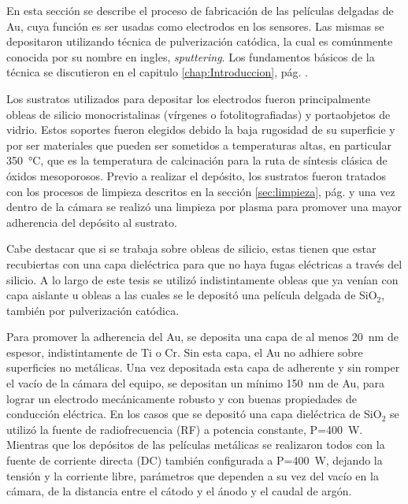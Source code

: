 			En esta sección se describe el proceso de fabricación de las películas delgadas de Au, cuya función es ser usadas como electrodos en los sensores. Las mismas se depositaron utilizando técnica de pulverización catódica, la cual es comúnmente conocida por su nombre en ingles, \textit{sputtering}\cite{sigmund1968}. Los fundamentos básicos de la técnica se discutieron en el capitulo \ref{chap:Introduccion}, pág. \pageref{sec:microfabricacion}.
							
			Los sustratos utilizados para depositar los electrodos fueron principalmente obleas de silicio monocristalinas (vírgenes o fotolitografiadas) y portaobjetos de vidrio. Estos soportes fueron elegidos debido la baja rugosidad de su superficie y por ser materiales que pueden ser sometidos a temperaturas altas, en particular \SI{350}{\celsius}, que es la temperatura de calcinación para la ruta de síntesis clásica de óxidos mesoporosos. Previo a realizar el depósito, los sustratos fueron tratados con los procesos de limpieza descritos en la sección \ref{sec:limpieza}, pág. \pageref{sec:limpieza} y una vez dentro de la cámara se realizó una limpieza por plasma para promover una mayor adherencia del depósito al sustrato.

			Cabe destacar que si se trabaja sobre obleas de silicio, estas tienen que estar recubiertas con una capa dieléctrica para que no haya fugas eléctricas a través del silicio. A lo largo de este tesis se utilizó indistintamente obleas que ya venían con capa aislante u obleas a las cuales se le depositó una película delgada de SiO$_2$, también por pulverización catódica.

			Para promover la adherencia del Au, se deposita una capa de al menos \SI{20}{\nm} de espesor, indistintamente de Ti o Cr. Sin esta capa, el Au no adhiere sobre superficies no metálicas\cite{Hieber1976}. Una vez depositada esta capa de adherente y sin romper el vacío de la cámara del equipo, se depositan un mínimo \SI{150}{\nm} de Au, para lograr un electrodo mecánicamente robusto y con buenas propiedades de conducción eléctrica. En los casos que se depositó una capa dieléctrica de SiO$_2$ se utilizó la fuente de radiofrecuencia (RF) a potencia constante, P=\SI{400}{W}. Mientras que los depósitos de las películas metálicas se realizaron todos con la fuente de corriente directa (DC) también configurada a P=\SI{400}{W}, dejando la tensión y la corriente libre, parámetros que dependen a su vez del vacío en la cámara, de la distancia entre el cátodo y el ánodo y el caudal de argón. 

